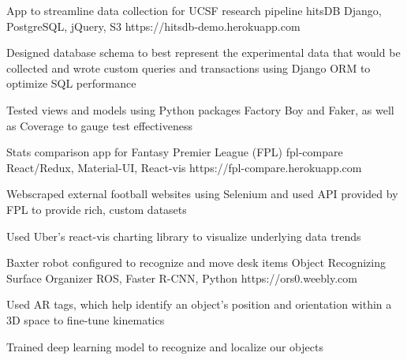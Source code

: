 \begin{cventries}
  \cventry
    {App to streamline data collection for UCSF research pipeline}
    {hitsDB}
    {Django, PostgreSQL, jQuery, S3}
    {https://hitsdb-demo.herokuapp.com}
    {
      \begin{cvitems}
        \item {Designed database schema to best represent the experimental data that would be collected and wrote custom queries and transactions using Django ORM to optimize SQL performance}
        \item {Tested views and models using Python packages Factory Boy and Faker, as well as Coverage to gauge test effectiveness}
      \end{cvitems}
    }
  \cventry
    {Stats comparison app for Fantasy Premier League (FPL)}
    {fpl-compare}
    {React/Redux, Material-UI, React-vis}
    {https://fpl-compare.herokuapp.com}
    {
      \begin{cvitems}
        \item {Webscraped external football websites using Selenium and used API provided by FPL to provide rich, custom datasets}
        \item {Used Uber’s react-vis charting library to visualize underlying data trends}
      \end{cvitems}
    }
  \cventry
    {Baxter robot configured to recognize and move desk items}
    {Object Recognizing Surface Organizer}
    {ROS, Faster R-CNN, Python}
    {https://ors0.weebly.com}
    {
      \begin{cvitems}
        \item {Used AR tags, which help identify an object's position and orientation within a 3D space to fine-tune kinematics}
        \item {Trained deep learning model to recognize and localize our objects}
      \end{cvitems}
    }
\end{cventries}
